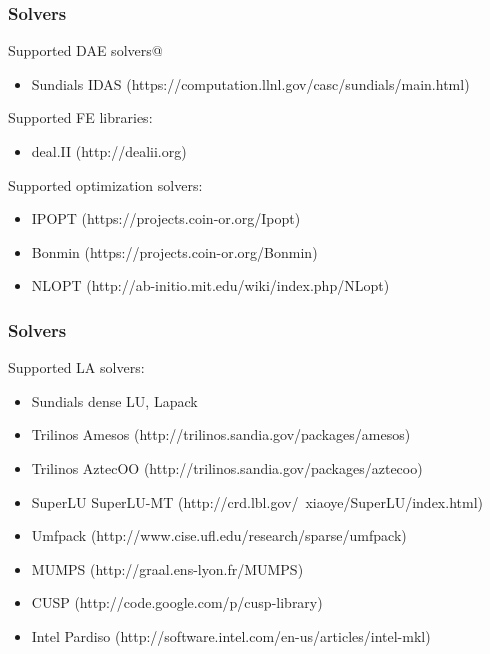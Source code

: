 \documentclass{beamer}
\begin{document}
\begin{frame}
\frametitle{Solvers}
\begin{block}{}
Supported DAE solvers@
\begin{itemize}
  \item Sundials IDAS ({\small https://computation.llnl.gov/casc/sundials/main.html})
\end{itemize}
\end{block}

\begin{block}{}
Supported FE libraries:
\begin{itemize}
  \item deal.II ({\small http://dealii.org})
\end{itemize}
\end{block}

\begin{block}{}
Supported optimization solvers:
\begin{itemize}
  \item IPOPT ({\small https://projects.coin-or.org/Ipopt}) 
  \item Bonmin ({\small https://projects.coin-or.org/Bonmin}) 
  \item NLOPT ({\small http://ab-initio.mit.edu/wiki/index.php/NLopt}) 
\end{itemize}
\end{block}
\end{frame}

\begin{frame}
\frametitle{Solvers}
\begin{block}{}
Supported LA solvers:
\begin{itemize}
  \item Sundials dense LU, Lapack
  \item Trilinos Amesos ({\small http://trilinos.sandia.gov/packages/amesos}) 
  \item Trilinos AztecOO ({\small http://trilinos.sandia.gov/packages/aztecoo}) 
  \item SuperLU SuperLU-MT ({\small http://crd.lbl.gov/~xiaoye/SuperLU/index.html}) 
  \item Umfpack ({\small http://www.cise.ufl.edu/research/sparse/umfpack}) 
  \item MUMPS ({\small http://graal.ens-lyon.fr/MUMPS})
  \item CUSP ({\small http://code.google.com/p/cusp-library}) 
  \item Intel Pardiso ({\small http://software.intel.com/en-us/articles/intel-mkl})
\end{itemize}
\end{block}
\end{frame}
\end{document}
